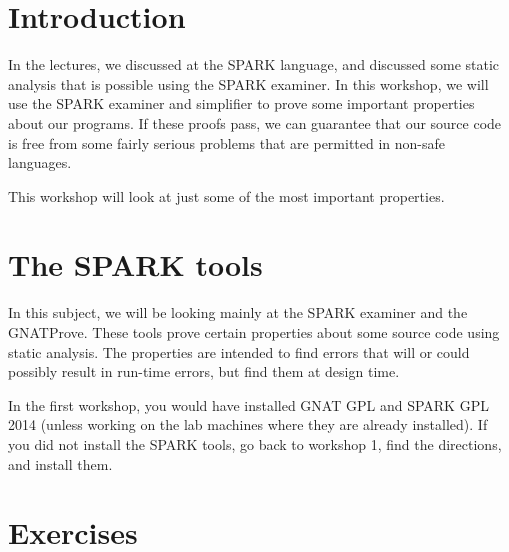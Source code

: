 \documentclass{article}
\begin{document}
\lstset{language=,aboveskip=3mm}

\section*{Introduction}

In the lectures, we discussed at the SPARK language, and discussed some static analysis that is possible using the SPARK examiner. In this workshop, we will use the SPARK examiner and simplifier to prove some important properties about our programs. If these proofs pass, we can guarantee that our source code is free from some fairly serious problems that are permitted in non-safe languages.

This workshop will look at just some of the most important properties.

\section*{The SPARK tools}

In this subject, we will be looking mainly at the SPARK examiner and the GNATProve. These tools prove certain properties about some source code using static analysis. The properties are intended to find errors that will or could possibly result in run-time errors, but find them at design time.

In the first workshop, you would have installed GNAT GPL and SPARK GPL 2014 (unless working on the lab machines where they are already installed). If you did not install the SPARK tools, go back to workshop 1, find the directions, and install them.

\section*{Exercises}
\end{document}
